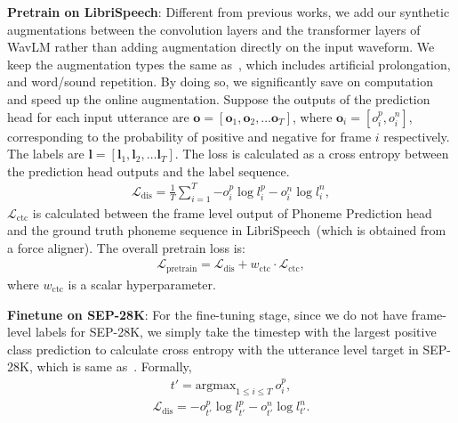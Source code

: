 \noindent
\textbf{Pretrain on LibriSpeech}:
Different from previous works, we add our synthetic augmentations between the convolution layers and the transformer layers of WavLM rather than adding augmentation directly on the input waveform.
We keep the augmentation types the same as~\cite{harvill22_interspeech}, which includes artificial prolongation, and word/sound repetition.
By doing so, we significantly save on computation and speed up the online augmentation.
Suppose the outputs of the prediction head for each input utterance are $\mathbf{o}=\left[ \mathbf{o}_1,\mathbf{o}_2,\dots \mathbf{o}_T \right]$, where $\mathbf{o}_i=\left[ o^p_i, o^n_i\right]$, corresponding to the probability of positive and negative for frame $i$ respectively.
The labels are $\mathbf{l}=\left[ \mathbf{l}_1,\mathbf{l}_2,\dots \mathbf{l}_T \right]$.
The loss is calculated as a cross entropy between the prediction head outputs and the label sequence.
\begin{align}
    \mathcal{L}_{\mathrm{dis}} = \frac{1}{T}\sum_{i=1}^{T}{
    -o^p_i \log{l^p_i}
    -o^n_i \log{l^n_i}},
\end{align}
$\mathcal{L}_{\mathrm{ctc}}$ is calculated between the frame level output of Phoneme Prediction head and the ground truth phoneme sequence in LibriSpeech~(which is obtained from a force aligner).
The overall pretrain loss is:
\begin{align}
    \mathcal{L}_{\mathrm{pretrain}} = \mathcal{L}_{\mathrm{dis}} + w_{\mathrm{ctc}} \cdot \mathcal{L}_{\mathrm{ctc}},
\end{align} where $w_{\mathrm{ctc}}$ is a scalar hyperparameter.

\noindent
\textbf{Finetune on SEP-28K}:
For the fine-tuning stage, since we do not have frame-level labels for SEP-28K, we simply take the timestep with the largest positive class prediction to calculate cross entropy with the utterance level target in SEP-28K, which is same as~\cite{harvill22_interspeech}. Formally,
\begin{align}
   t'= \mathrm{argmax}_{1\leq i \leq T}{~o^p_i},
\end{align}
\begin{align}
   \mathcal{L}_{\mathrm{dis}} = 
    -o^p_{t'} \log{l^p_{t'}}
    -o^n_{t'} \log{l^n_{t'}}.
\end{align}





